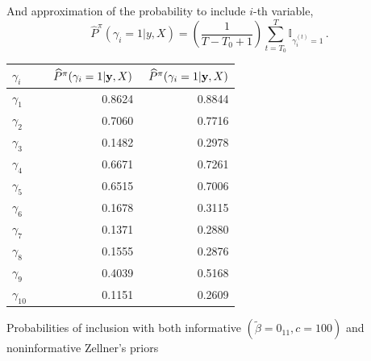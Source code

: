 \begin{slide}
\pause\vs
And approximation of the probability to include $i$-th variable,
$$
{\widehat{P}}^\pi(\gamma_i=1|y,X)=\left(\frac{1}{T-T_0+1}\right)\sum_{t=T_0}^T 
\mathbb{I}_{\gamma^{(t)}_i=1}\,.
$$
\end{slide}\begin{slide}

\begin{center}
\small
\begin{tabular}{l c|r|r}
 $\gamma_i$    && $\ {\widehat{P}}^\pi(\gamma_i=1|\by,X)$ 
& $\ {\widehat{P}}^\pi (\gamma_i=1|\by,X)$\\                                                    
\hline $\gamma_1$    && 0.8624 & 0.8844 \\
 $\gamma_2$    && 0.7060 & 0.7716 \\
 $\gamma_3$    && 0.1482 & 0.2978 \\
 $\gamma_4$    && 0.6671 & 0.7261 \\
 $\gamma_5$    && 0.6515 & 0.7006 \\
 $\gamma_6$    && 0.1678 & 0.3115 \\
 $\gamma_7$    && 0.1371 & 0.2880 \\
 $\gamma_8$    && 0.1555 & 0.2876 \\
 $\gamma_9$    && 0.4039 & 0.5168 \\
 $\gamma_{10}$ && 0.1151 & 0.2609 \\
\end{tabular}
\normalsize

Probabilities of inclusion with both informative
$(\tilde\beta=0_{11},c=100)$ and noninformative  Zellner's priors 
\end{center}


\end{slide}
